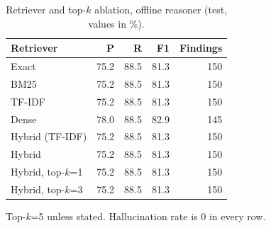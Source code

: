 \begin{table}[t]
\centering
\footnotesize
\setlength{\tabcolsep}{4pt}
\caption{Retriever and top-$k$ ablation, offline reasoner (test, values in \%).}
\label{tab:ablations-test}
\begin{tabular}{lrrrr}
\toprule
Retriever & P & R & F1 & Findings \\
\midrule
Exact & 75.2 & 88.5 & 81.3 & 150 \\
BM25 & 75.2 & 88.5 & 81.3 & 150 \\
TF-IDF & 75.2 & 88.5 & 81.3 & 150 \\
Dense & 78.0 & 88.5 & 82.9 & 145 \\
Hybrid (TF-IDF) & 75.2 & 88.5 & 81.3 & 150 \\
Hybrid & 75.2 & 88.5 & 81.3 & 150 \\
Hybrid, top-$k$=1 & 75.2 & 88.5 & 81.3 & 150 \\
Hybrid, top-$k$=3 & 75.2 & 88.5 & 81.3 & 150 \\
\bottomrule
\end{tabular}
\par\vspace{2pt}\parbox{\linewidth}{\scriptsize Top-$k$=5 unless stated. Hallucination rate is 0 in every row.}
\end{table}
